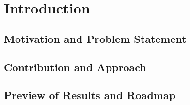 \section{Introduction}\label{sec:intro}

\subsection{Motivation and Problem Statement}

\subsection{Contribution and Approach}

\subsection{Preview of Results and Roadmap}
